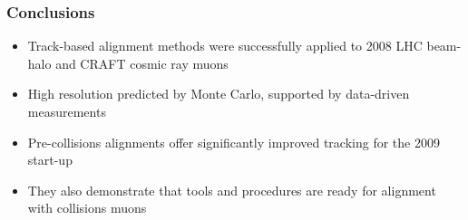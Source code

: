 \documentclass[compress]{beamer}
\begin{document}
\begin{frame}
\frametitle{Conclusions}

\begin{itemize}\setlength{\itemsep}{0.5 cm}
\item Track-based alignment methods were successfully applied to 2008 LHC beam-halo and CRAFT cosmic ray muons
\item High resolution predicted by Monte Carlo, supported by data-driven measurements
\item Pre-collisions alignments offer significantly improved tracking for the 2009 start-up
\item They also demonstrate that tools and procedures are ready for alignment with collisions muons
\end{itemize}

\label{numpages}
\end{frame}
\end{document}
